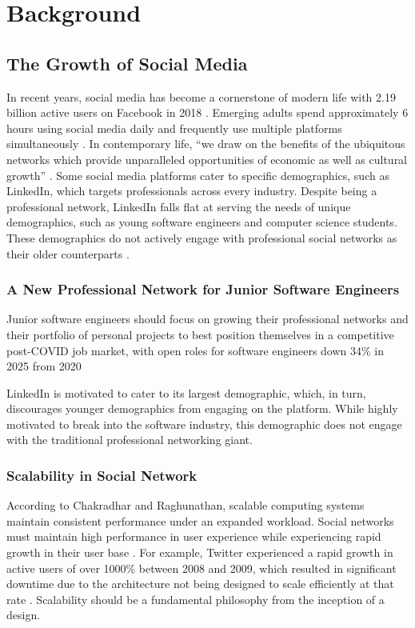 \chapter{Background}
\label{cha:background}

\section{The Growth of Social Media}
In recent years, social media has become a cornerstone of modern life with 2.19 billion active users on Facebook in 2018 \citep{saha2019impact}. Emerging adults spend approximately 6 hours using social media daily and frequently use multiple platforms simultaneously \citep{vannucci2019use}.
In contemporary life, ``we draw on the benefits of the ubiquitous networks which provide unparalleled opportunities of economic as well as cultural growth'' \citep{hruska2020use}.
Some social media platforms cater to specific demographics, such as LinkedIn, which targets professionals across every industry.
Despite being a professional network, LinkedIn falls flat at serving the needs of unique demographics, such as young software engineers and computer science students.
These demographics do not actively engage with professional social networks as their older counterparts \citep{florenthal2012college}. 

\subsection{A New Professional Network for Junior Software Engineers}
Junior software engineers should focus on growing their professional networks and their portfolio of personal projects to best position themselves in a competitive post-COVID job market, with open roles for software engineers down 34\% in 2025 from 2020 \citep{fredsoftware2025}

LinkedIn is motivated to cater to its largest demographic, which, in turn, discourages younger demographics from engaging on the platform.
While highly motivated to break into the software industry, this demographic does not engage with the traditional professional networking giant.

\subsection{Scalability in Social Network}
According to Chakradhar and Raghunathan, scalable computing systems maintain consistent performance under an expanded workload.
Social networks must maintain high performance in user experience while experiencing rapid growth in their user base \citep{pujol2010little}.
For example, Twitter experienced a rapid growth in active users of over 1000\% between 2008 and 2009, which resulted in significant downtime due to the architecture not being designed to scale efficiently at that rate \citep{sakaki2010earthquake}.
Scalability should be a fundamental philosophy from the inception of a design.
